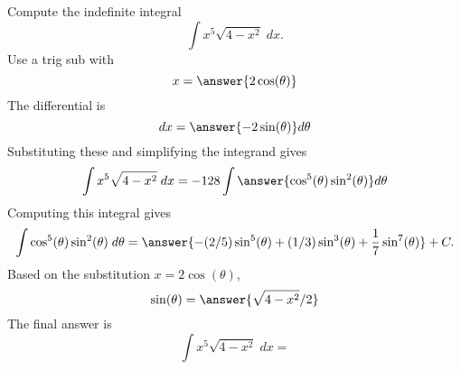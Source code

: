 \documentclass{ximera}
\begin{document}
\begin{problem}

Compute the indefinite integral
\[
\int   x^5 \sqrt{4-x^2} \; dx.
\]
Use a trig sub with\\
\[
x = \answer{2\cos(\theta)}
\]
The differential is\\
\[
dx = \answer{-2\sin(\theta)}d\theta
\]
Substituting these and simplifying the integrand gives\\
\[
\int   x^5\sqrt{4 - x^2}\; dx = -128\int \answer{\cos^5(\theta)\sin^2(\theta)} d\theta
\]
Computing this integral gives
\[
\int \cos^5(\theta)\sin^2(\theta) \; d\theta = \answer{-(2/5)\sin^5(\theta) + (1/3)\sin^3(\theta) +\frac17 \sin^7(\theta)} + C.
\]
Based on the substitution $x = 2\cos(\theta)$, \\
\[
\sin(\theta) = \answer{\sqrt{4 - x^2}/2}
\]
The final answer is
\[
\int   x^5\sqrt{4 -  x^2}\; dx = 
\]
\begin{center}
\begin{multipleChoice}
\end{multipleChoice}
\end{center}

\end{problem}
\end{document}
